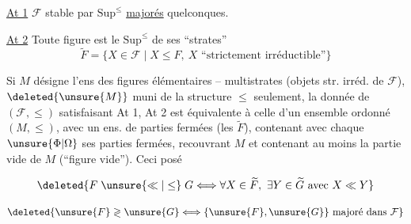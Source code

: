 \uline{At 1} $\mathcal{F}$ stable par $\mathrm{Sup}^{\leq}$  \uline{majorés} quelconques.

\uline{At 2} Toute figure est le $\mathrm{Sup}^{\leq}$ de  ses ``strates''
\[
\widetilde{F}=\{X\in\mathcal{F}\mid X\leq F,\ X\text{ ``strictement irréductible''}\}
\]

 Si $M$ désigne l'ens des figures élémentaires -- multistrates (objets str. irréd. de $\mathcal{F}$), $\deleted{\unsure{M}}$ muni de la structure $\leq$ seulement,  la donnée de $(\mathcal{F},\leq)$ satisfaisant  At 1, At 2  est équivalente à celle d'un ensemble ordonné $(M,\leq)$, avec un ens. de parties fermées (les $\widetilde{F}$), contenant avec chaque $\unsure{\Phi|\Omega}$ ses parties fermées,  recouvrant $M$  et contenant au moins la partie vide de $M$ (``figure vide''). Ceci posé

\[
\deleted{F\mathrel{\unsure{\ll|\leq}}G\Longleftrightarrow\forall X\in\widetilde{F},\ \exists Y\in\widetilde{G}\text{ avec }X\ll Y}
\]

\[
\deleted{\unsure{F}\mathrel{\gtrless}\unsure{G}\Longleftrightarrow\{\unsure{F},\unsure{G}\}\text{ majoré dans }\mathcal{F}}
\]
 

